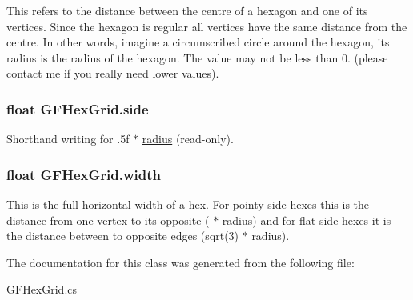 This refers to the distance between the centre of a hexagon and one of its vertices. Since the hexagon is regular all vertices have the same distance from the centre. In other words, imagine a circumscribed circle around the hexagon, its radius is the radius of the hexagon. The value may not be less than 0. (please contact me if you really need lower values). \hypertarget{class_g_f_hex_grid_a09ba217a58d06021fe82fed119c96969_a09ba217a58d06021fe82fed119c96969}{
\subsubsection[{side}]{\setlength{\rightskip}{0pt plus 5cm}float G\+F\+Hex\+Grid.\+side\hspace{0.3cm}{\ttfamily [get]}}}\label{class_g_f_hex_grid_a09ba217a58d06021fe82fed119c96969_a09ba217a58d06021fe82fed119c96969}
Shorthand writing for {.\+5f $\ast$ \hyperlink{class_g_f_hex_grid_a99701e2998e2b7305bb1bbe0c1ef9506_a99701e2998e2b7305bb1bbe0c1ef9506}{radius}} (read-\/only).\hypertarget{class_g_f_hex_grid_a6d9ef76fc36e9b3709feb605219672a7_a6d9ef76fc36e9b3709feb605219672a7}{
\subsubsection[{width}]{\setlength{\rightskip}{0pt plus 5cm}float G\+F\+Hex\+Grid.\+width\hspace{0.3cm}{\ttfamily [get]}}}\label{class_g_f_hex_grid_a6d9ef76fc36e9b3709feb605219672a7_a6d9ef76fc36e9b3709feb605219672a7}
This is the full horizontal width of a hex. For pointy side hexes this is the distance from one vertex to its opposite ({ $\ast$ radius}) and for flat side hexes it is the distance between to opposite edges ({\ttfamily sqrt(3) $\ast$ radius}). 

The documentation for this class was generated from the following file\+:\begin{DoxyCompactItemize}
\item 
G\+F\+Hex\+Grid.\+cs\end{DoxyCompactItemize}
